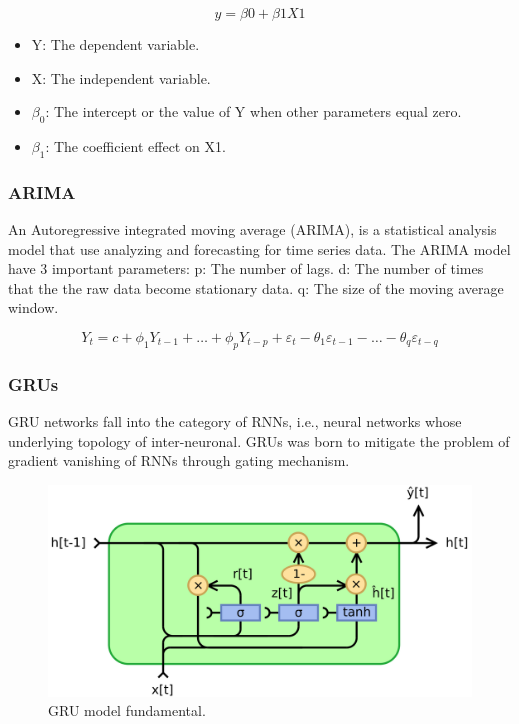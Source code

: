 \documentclass{ieeeojies}
\begin{document}
\begin{equation}
y = \beta0 + \beta1X1
\end{equation}

\begin{itemize}
\item Y: The dependent variable.
\item X: The independent variable.
\item $\beta_0$: The intercept or the value of Y when other parameters equal zero.
\item $\beta_1$: The coefficient effect on X1. 
\end{itemize}

\subsubsection{ARIMA}
An Autoregressive integrated moving average (ARIMA), is a statistical analysis model that use analyzing and forecasting for time series data.
The ARIMA model have 3 important parameters:
p: The number of lags.
d: The number of times that the the raw data become stationary data.
q: The size of the moving average window.

\begin{equation}
    Y_t = c + \phi_1 Y_{t-1}  + \ldots + \phi_p Y_{t-p} + \varepsilon_t - \theta_1 \varepsilon_{t-1} - \ldots - \theta_q \varepsilon_{t-q}
\end{equation}

\subsubsection{GRUs}
GRU networks fall into the category of RNNs, i.e., neural networks whose underlying topology of inter-neuronal. GRUs was born to mitigate the problem of gradient vanishing of RNNs through gating mechanism.\cite{a3}
\begin{figure}[H]
    \centering
    \includegraphics[width=0.8\linewidth]{GRU.PNG}
    \caption{GRU model fundamental.}
    \label{fig:example}
\end{figure}
\end{document}
